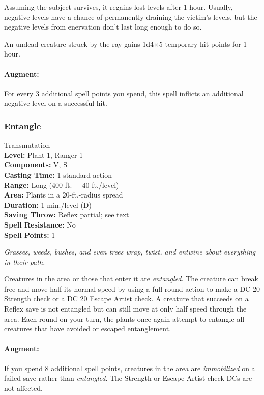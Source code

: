 Assuming the subject survives, it regains lost levels after 1 hour. 
Usually, negative levels have a chance of permanently draining the victim's levels,
but the negative levels from enervation don't last long enough to do so.

An undead creature struck by the ray gains 1d4$\times$5 temporary hit points for 1 hour.

\paragraph{Augment:} For every 3 additional spell points you spend, this spell inflicts an additional negative level on a successful hit.
\subsubsection{Entangle}
\label{Spell:Entangle}
Transmutation
\\ \textbf{Level:} Plant 1, Ranger 1
\\ \textbf{Components:} V, S
\\ \textbf{Casting Time:} 1 standard action
\\ \textbf{Range:} Long (400 ft. + 40 ft./level)
\\ \textbf{Area:} Plants in a 20-ft.-radius spread
\\ \textbf{Duration:} 1 min./level (D)
\\ \textbf{Saving Throw:} Reflex partial; see text
\\ \textbf{Spell Resistance:} No
\\ \textbf{Spell Points:} 1

\emph{Grasses, weeds, bushes, and even trees wrap, twist, and entwine about everything in their path.} 

Creatures in the area or those that enter it are \emph{entangled}.
The creature can break free and move half its normal speed by using a full-round action to make a DC 20 Strength check or a DC 20 Escape Artist check. 
A creature that succeeds on a Reflex save is not entangled but can still move at only half speed through the area. 
Each round on your turn, the plants once again attempt to entangle all creatures that have avoided or escaped entanglement.

\paragraph{Augment:} If you spend 8 additional spell points, creatures in the area are \emph{immobilized} on a failed save rather than \emph{entangled}. The Strength or Escape Artist check DCs are not affected.

